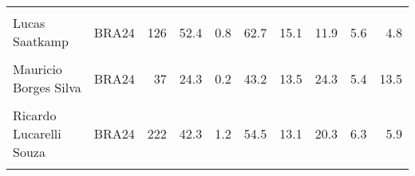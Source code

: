 \documentclass[
]{book}
\begin{document}
\begin{table}[!h]
{\begin{tabular}[t]{llrrrrrrrr}
\addlinespace
\cellcolor{gray!10}{Judson Amabel Nunes Da Cunha Jr} & \cellcolor{gray!10}{BRA24} & \cellcolor{gray!10}{36} & \cellcolor{gray!10}{44.4} & \cellcolor{gray!10}{0.2} & \cellcolor{gray!10}{55.6} & \cellcolor{gray!10}{8.3} & \cellcolor{gray!10}{25.0} & \cellcolor{gray!10}{5.6} & \cellcolor{gray!10}{5.6}\\
Lucas Saatkamp & BRA24 & 126 & 52.4 & 0.8 & 62.7 & 15.1 & 11.9 & 5.6 & 4.8\\
\cellcolor{gray!10}{Lukas Felipe Bergmann} & \cellcolor{gray!10}{BRA24} & \cellcolor{gray!10}{47} & \cellcolor{gray!10}{29.8} & \cellcolor{gray!10}{0.2} & \cellcolor{gray!10}{46.8} & \cellcolor{gray!10}{17.0} & \cellcolor{gray!10}{19.1} & \cellcolor{gray!10}{0.0} & \cellcolor{gray!10}{17.0}\\
Mauricio Borges Silva & BRA24 & 37 & 24.3 & 0.2 & 43.2 & 13.5 & 24.3 & 5.4 & 13.5\\
\cellcolor{gray!10}{Otavio Henrique Rodrigues Pinto} & \cellcolor{gray!10}{BRA24} & \cellcolor{gray!10}{4} & \cellcolor{gray!10}{50.0} & \cellcolor{gray!10}{0.0} & \cellcolor{gray!10}{75.0} & \cellcolor{gray!10}{0.0} & \cellcolor{gray!10}{0.0} & \cellcolor{gray!10}{0.0} & \cellcolor{gray!10}{25.0}\\
\addlinespace
Ricardo Lucarelli Souza & BRA24 & 222 & 42.3 & 1.2 & 54.5 & 13.1 & 20.3 & 6.3 & 5.9\\
\cellcolor{gray!10}{Yoandy Leal Hidalgo} & \cellcolor{gray!10}{BRA24} & \cellcolor{gray!10}{197} & \cellcolor{gray!10}{39.6} & \cellcolor{gray!10}{1.1} & \cellcolor{gray!10}{54.3} & \cellcolor{gray!10}{9.6} & \cellcolor{gray!10}{21.3} & \cellcolor{gray!10}{8.1} & \cellcolor{gray!10}{6.6}\\
\bottomrule
\end{tabular}}
\end{table}
\end{document}
